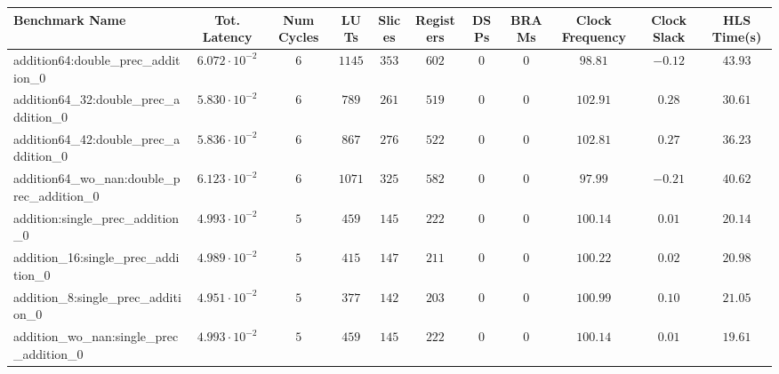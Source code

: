 \begin{tabular}{|l|c|c|c|c|c|c|c|c|c|c|}
\hline
Benchmark Name                                            & Tot. Latency            & Num Cycles & LUTs       & Slices    & Registers & DSPs    & BRAMs & Clock Frequency & Clock Slack & HLS Time(s) \\
\hline
addition64:double\_prec\_addition\_0                      & $ 6.072 \cdot 10^{-2} $ & $ 6      $ & $ 1145   $ & $ 353   $ & $ 602   $ & $ 0   $ & $ 0 $ & $ 98.81       $ & $ -0.12   $ & $ 43.93   $ \\
addition64\_32:double\_prec\_addition\_0                  & $ 5.830 \cdot 10^{-2} $ & $ 6      $ & $ 789    $ & $ 261   $ & $ 519   $ & $ 0   $ & $ 0 $ & $ 102.91      $ & $ 0.28    $ & $ 30.61   $ \\
addition64\_42:double\_prec\_addition\_0                  & $ 5.836 \cdot 10^{-2} $ & $ 6      $ & $ 867    $ & $ 276   $ & $ 522   $ & $ 0   $ & $ 0 $ & $ 102.81      $ & $ 0.27    $ & $ 36.23   $ \\
addition64\_wo\_nan:double\_prec\_addition\_0             & $ 6.123 \cdot 10^{-2} $ & $ 6      $ & $ 1071   $ & $ 325   $ & $ 582   $ & $ 0   $ & $ 0 $ & $ 97.99       $ & $ -0.21   $ & $ 40.62   $ \\
addition:single\_prec\_addition\_0                        & $ 4.993 \cdot 10^{-2} $ & $ 5      $ & $ 459    $ & $ 145   $ & $ 222   $ & $ 0   $ & $ 0 $ & $ 100.14      $ & $ 0.01    $ & $ 20.14   $ \\
addition\_16:single\_prec\_addition\_0                    & $ 4.989 \cdot 10^{-2} $ & $ 5      $ & $ 415    $ & $ 147   $ & $ 211   $ & $ 0   $ & $ 0 $ & $ 100.22      $ & $ 0.02    $ & $ 20.98   $ \\
addition\_8:single\_prec\_addition\_0                     & $ 4.951 \cdot 10^{-2} $ & $ 5      $ & $ 377    $ & $ 142   $ & $ 203   $ & $ 0   $ & $ 0 $ & $ 100.99      $ & $ 0.10    $ & $ 21.05   $ \\
addition\_wo\_nan:single\_prec\_addition\_0               & $ 4.993 \cdot 10^{-2} $ & $ 5      $ & $ 459    $ & $ 145   $ & $ 222   $ & $ 0   $ & $ 0 $ & $ 100.14      $ & $ 0.01    $ & $ 19.61   $ \\

\end{tabular}
